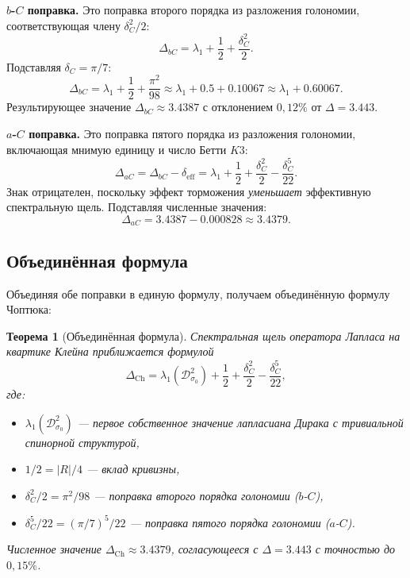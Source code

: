 \documentclass[12pt,a4paper]{article}
\newtheorem{theorem}{Теорема}[section]
\theoremstyle{definition}
\theoremstyle{remark}
\newcommand{\cD}{\mathcal{D}}
\begin{document}
\medskip

\noindent\textbf{$b$-$C$ поправка.} Это поправка второго порядка из разложения голономии, соответствующая члену $\delta_C^2/2$:
\begin{equation}
\Delta_{bC} = \lambda_1 + \frac{1}{2} + \frac{\delta_C^2}{2}.
\end{equation}
Подставляя $\delta_C = \pi/7$:
\begin{equation}
\Delta_{bC} = \lambda_1 + \frac{1}{2} + \frac{\pi^2}{98} \approx \lambda_1 + 0.5 + 0.10067 \approx \lambda_1 + 0.60067.
\end{equation}
Результирующее значение $\Delta_{bC} \approx 3.4387$ с отклонением $0{,}12\%$ от $\Delta = 3.443$.

\medskip

\noindent\textbf{$a$-$C$ поправка.} Это поправка пятого порядка из разложения голономии, включающая мнимую единицу и число Бетти $K3$:
\begin{equation}
\Delta_{aC} = \Delta_{bC} - \delta_{\mathrm{eff}} = \lambda_1 + \frac{1}{2} + \frac{\delta_C^2}{2} - \frac{\delta_C^5}{22}.
\end{equation}
Знак отрицателен, поскольку эффект торможения \emph{уменьшает} эффективную спектральную щель. Подставляя численные значения:
\begin{equation}
\Delta_{aC} = 3.4387 - 0.000828 \approx 3.4379.
\end{equation}

\subsection{Объединённая формула}

Объединяя обе поправки в единую формулу, получаем объединённую формулу Чоптюка:

\begin{theorem}[Объединённая формула]
\label{thm:unified}
Спектральная щель оператора Лапласа на квартике Клейна приближается формулой
\begin{equation}
\Delta_{\mathrm{Ch}} = \lambda_1(\cD^2_{\sigma_0}) + \frac{1}{2} + \frac{\delta_C^2}{2} - \frac{\delta_C^5}{22},
\end{equation}
где:
\begin{itemize}
\item $\lambda_1(\cD^2_{\sigma_0})$ --- первое собственное значение лапласиана Дирака с тривиальной спинорной структурой,
\item $1/2 = |R|/4$ --- вклад кривизны,
\item $\delta_C^2/2 = \pi^2/98$ --- поправка второго порядка голономии ($b$-$C$),
\item $\delta_C^5/22 = (\pi/7)^5/22$ --- поправка пятого порядка голономии ($a$-$C$).
\end{itemize}
Численное значение $\Delta_{\mathrm{Ch}} \approx 3.4379$, согласующееся с $\Delta = 3.443$ с точностью до $0{,}15\%$.
\end{theorem}
\end{document}
